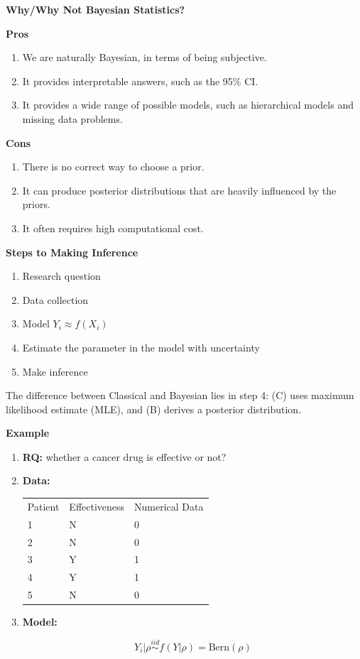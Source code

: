 \documentclass[12pt,xcolor=svgnames]{beamer}
\newcommand{\bl}{\color{blue}}
\newcommand{\theme}{\color{FireBrick}}
\newcommand{\sk}{\vspace{.4cm}}
\newcommand{\chap}[1]{{\theme \Large \bf #1} \sk}
\begin{document}
\begin{frame}
\chap{Why/Why Not Bayesian Statistics?} 

{\bf \bl Pros}
\begin{enumerate}
\item We are naturally Bayesian, in terms of being subjective.
\item It provides interpretable answers, such as the 95\% CI.
\item It provides a wide range of possible models, such as hierarchical models and missing data problems.
\end{enumerate}
{\bf \bl Cons}
\begin{enumerate}
\item There is no correct way to choose a prior.
\item It can produce posterior distributions that are heavily influenced by the priors.
\item It often requires high computational cost.
\end{enumerate}


\end{frame}


\begin{frame}
\chap{Steps to Making Inference} 


\begin{enumerate}
\item Research question
\item Data collection
\item Model $Y_i \approx f(X_i)$ 
\item Estimate the parameter in the model with uncertainty
\item Make inference
\end{enumerate}

The difference between {\bl Classical} and {\bl Bayesian} lies in step 4: (C) uses maximum likelihood estimate (MLE), and (B) derives a posterior distribution.
\end{frame}



\begin{frame}
\chap{Example}
\begin{enumerate}
\item {\bf RQ:} whether a cancer drug is effective or not?
\item {\bf Data:}

 \begin{tabular}{lll}
Patient & Effectiveness & Numerical Data \\
1& N& 0\\
2&N&0\\
3&Y&1\\
4&Y&1\\
5&N&0
\end{tabular}
\item {\bf Model:} 

$$Y_i|\rho  \stackrel{iid}{\sim} f(Y|\rho) = \text{Bern}(\rho)$$ 
\end{enumerate}
\end{frame}
\end{document}
